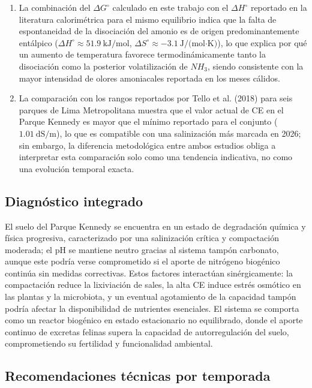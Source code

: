 \documentclass[fleqn]{jaes}
\begin{document}
\begin{enumerate}
  \item La combinación del $\Delta G^\circ$ calculado en este trabajo con el $\Delta H^\circ$ reportado en la literatura calorimétrica para el mismo equilibrio \cite{Olofsson1975} indica que la falta de espontaneidad de la disociación del amonio es de origen predominantemente entálpico ($\Delta H^\circ \approx 51.9~\text{kJ/mol}$, $\Delta S^\circ \approx -3.1~\text{J/(mol·K)}$), lo que explica por qué un aumento de temperatura favorece termodinámicamente tanto la disociación como la posterior volatilización de $NH_3$, siendo consistente con la mayor intensidad de olores amoniacales reportada en los meses cálidos.

  \item La comparación con los rangos reportados por Tello et al. (2018) para seis parques de Lima Metropolitana muestra que el valor actual de CE en el Parque Kennedy es mayor que el mínimo reportado para el conjunto ($1.01~\text{dS/m}$), lo que es compatible con una salinización más marcada en 2026; sin embargo, la diferencia metodológica entre ambos estudios obliga a interpretar esta comparación solo como una tendencia indicativa, no como una evolución temporal exacta.
\end{enumerate}

\subsection{Diagnóstico integrado}

El suelo del Parque Kennedy se encuentra en un estado de degradación química y física progresiva, caracterizado por una salinización crítica y compactación moderada; el pH se mantiene neutro gracias al sistema tampón carbonato, aunque este podría verse comprometido si el aporte de nitrógeno biogénico continúa sin medidas correctivas. Estos factores interactúan sinérgicamente: la compactación reduce la lixiviación de sales, la alta CE induce estrés osmótico en las plantas y la microbiota, y un eventual agotamiento de la capacidad tampón podría afectar la disponibilidad de nutrientes esenciales. El sistema se comporta como un reactor biogénico en estado estacionario no equilibrado, donde el aporte continuo de excretas felinas supera la capacidad de autorregulación del suelo, comprometiendo su fertilidad y funcionalidad ambiental.

\subsection{Recomendaciones técnicas por temporada}
\end{document}

